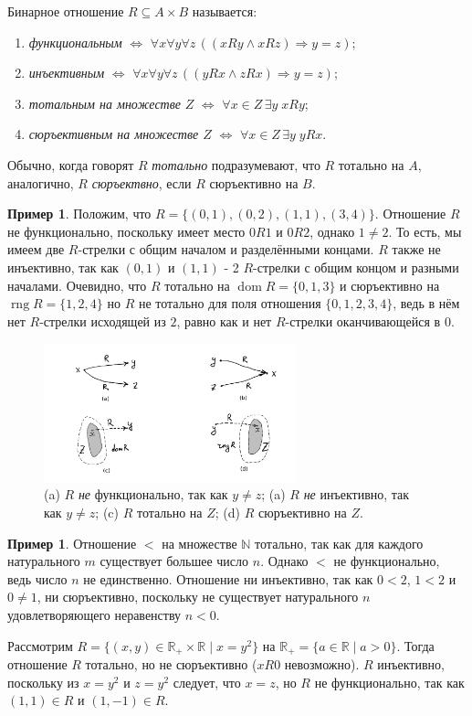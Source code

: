 \documentclass[12pt,notitlepage]{article}
\theoremstyle{plain}
\theoremstyle{definition}
\newtheorem{exm}[thm]{Пример}
\theoremstyle{plain}
\newcommand{\N}{\mathbb{N}}
\newcommand{\R}{\mathbb{R}}
\newcommand{\sbs}{\subseteq}
\newcommand{\dom}{\mathop{\mathrm{dom}}}
\newcommand{\rng}{\mathop{\mathrm{rng}}}
\newcommand{\1}{\mathbf{1}}
\newcommand{\0}{\mathbf{0}}
\newcommand{\ply}{\Longrightarrow}
\begin{document}
Бинарное отношение $R \sbs A \times B$ называется:
\begin{enumerate}
	\item \emph{функциональным} $\iff$ $\forall x \forall y \forall z\, ( (x R y \wedge x R z) \ply y = z )$;
	\item \emph{инъективным} $\iff$ $\forall x \forall y \forall z\, ( (y R x \wedge z R x) \ply y = z )$;
	\item \emph{тотальным на множестве} $Z$ $\iff$ $\forall x \in Z\, \exists y\; x R y$;
	\item \emph{сюръективным на множестве $Z$} $\iff$ $\forall x \in Z\, \exists y\; y R x$.
\end{enumerate}
Обычно, когда говорят $R$ \emph{тотально} подразумевают, что $R$ тотально на $A$, аналогично, $R$ \emph{сюръектвно}, если $R$ сюръективно на $B$.

\begin{exm}
	Положим, что $R = \{(0,1), (0,2), (1,1), (3,4)\}$. Отношение $R$ не функционально, поскольку имеет место $0 R 1$ и $0 R 2$, однако $1 \neq 2$. То есть, мы имеем две $R$-стрелки с общим началом и разделёнными концами. $R$ также не инъективно, так как $(0, 1)$ и $(1, 1)$ - 2 $R$-стрелки с общим концом и разными началами. Очевидно, что $R$ тотально на $\dom R = \{0,1,3\}$ и сюръективно на $\rng R = \{1,2,4\}$ но $R$ не тотально для поля отношения $\{0,1,2,3,4\}$, ведь в нём нет $R$-стрелки исходящей из $2$, равно как и нет $R$-стрелки оканчивающейся в $0$.
\end{exm}

\begin{figure}[h]
	\centering
	\includegraphics*[width=0.65\textwidth]{func_etc.pdf}
	\caption{(a) $R$ \emph{не} функционально, так как $y \neq z$; (a) $R$ \emph{не} инъективно, так как $y \neq z$; (c) $R$ тотально на $Z$; (d) $R$ сюръективно на $Z$.}
\end{figure}


\begin{exm}
	Отношение ${<}$ на множестве $\N$ тотально, так как для каждого натурального $m$ существует большее число $n$. Однако ${<}$ не функционально, ведь число $n$ не единственно. Отношение ни инъективно, так как $0 < 2$, $1 < 2$ и $0 \neq 1$, ни сюръективно, поскольку не существует натурального $n$ удовлетворяющего неравенству $n < 0$. 
	
	Рассмотрим $R = \{(x,y) \in \R_{+} \times \R \mid x = y^2 \}$ на $\R_+ = \{a \in \R  \mid a > 0\}$. Тогда отношение $R$ тотально, но не сюръективно ($xR0$ невозможно). $R$ инъективно, поскольку из $x = y^2$ и $z = y^2$ следует, что $x = z$, но $R$ не функционально, так как $(1, 1) \in R$ и $(1, -1) \in R$.
\end{exm}
\end{document}
